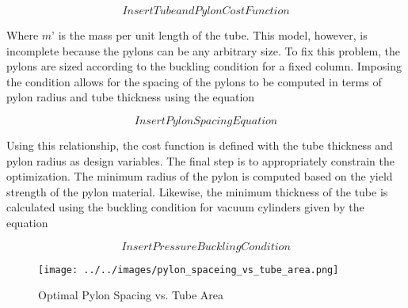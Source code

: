 \begin{equation}
\label{eq:tube_pylon_cost}
Insert Tube and Pylon Cost Function
\end{equation}

Where $m’$ is the mass per unit length of the tube. This model, however, is incomplete because the pylons can be any arbitrary size. To fix this problem, the pylons are sized according to the buckling condition for a fixed column. Imposing the condition allows for the spacing of the pylons to be computed in terms of pylon radius and tube thickness using the equation

\begin{equation}
\label{eq:pylon_spacing}
Insert Pylon Spacing Equation
\end{equation}

Using this relationship, the cost function is defined with the tube thickness and pylon radius as design variables. The final step is to appropriately constrain the optimization. The minimum radius of the pylon is computed based on the yield strength of the pylon material. Likewise, the minimum thickness of the tube is calculated using the buckling condition for vacuum cylinders given by the equation \cite{thin_walled_buckling}

\begin{equation}
\label{eq:pres_buckling}
Insert Pressure Buckling Condition
\end{equation}

\begin{figure}
	\centering
	\texttt{[image: ../../images/pylon\_spaceing\_vs\_tube\_area.png]}
	\caption{Optimal Pylon Spacing vs. Tube Area}
	\label{fig:pylon_spacing_vs_tube_area}
\end{figure}

